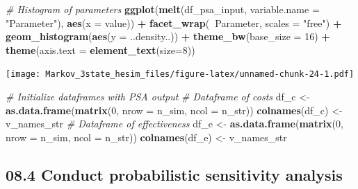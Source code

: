 \documentclass[
]{article}
\newenvironment{Shaded}{\begin{snugshade}}{\end{snugshade}}
\newcommand{\CommentTok}[1]{\textcolor[rgb]{0.56,0.35,0.01}{\textit{#1}}}
\newcommand{\DataTypeTok}[1]{\textcolor[rgb]{0.13,0.29,0.53}{#1}}
\newcommand{\DecValTok}[1]{\textcolor[rgb]{0.00,0.00,0.81}{#1}}
\newcommand{\KeywordTok}[1]{\textcolor[rgb]{0.13,0.29,0.53}{\textbf{#1}}}
\newcommand{\NormalTok}[1]{#1}
\newcommand{\OperatorTok}[1]{\textcolor[rgb]{0.81,0.36,0.00}{\textbf{#1}}}
\newcommand{\StringTok}[1]{\textcolor[rgb]{0.31,0.60,0.02}{#1}}
\begin{document}
\begin{Shaded}
\begin{Highlighting}[]
\CommentTok{# Histogram of parameters}
\KeywordTok{ggplot}\NormalTok{(}\KeywordTok{melt}\NormalTok{(df_psa_input, }\DataTypeTok{variable.name =} \StringTok{"Parameter"}\NormalTok{), }\KeywordTok{aes}\NormalTok{(}\DataTypeTok{x =}\NormalTok{ value)) }\OperatorTok{+}
\StringTok{       }\KeywordTok{facet_wrap}\NormalTok{(}\OperatorTok{~}\NormalTok{Parameter, }\DataTypeTok{scales =} \StringTok{"free"}\NormalTok{) }\OperatorTok{+}
\StringTok{       }\KeywordTok{geom_histogram}\NormalTok{(}\KeywordTok{aes}\NormalTok{(}\DataTypeTok{y =}\NormalTok{ ..density..)) }\OperatorTok{+}
\StringTok{       }\KeywordTok{theme_bw}\NormalTok{(}\DataTypeTok{base_size =} \DecValTok{16}\NormalTok{) }\OperatorTok{+}\StringTok{ }
\StringTok{       }\KeywordTok{theme}\NormalTok{(}\DataTypeTok{axis.text =} \KeywordTok{element_text}\NormalTok{(}\DataTypeTok{size=}\DecValTok{8}\NormalTok{))}
\end{Highlighting}
\end{Shaded}

\texttt{[image: Markov\_3state\_hesim\_files/figure-latex/unnamed-chunk-24-1.pdf]}

\begin{Shaded}
\begin{Highlighting}[]
\CommentTok{# Initialize dataframes with PSA output }
\CommentTok{# Dataframe of costs}
\NormalTok{df_c <-}\StringTok{ }\KeywordTok{as.data.frame}\NormalTok{(}\KeywordTok{matrix}\NormalTok{(}\DecValTok{0}\NormalTok{, }
                      \DataTypeTok{nrow =}\NormalTok{ n_sim,}
                      \DataTypeTok{ncol =}\NormalTok{ n_str))}
\KeywordTok{colnames}\NormalTok{(df_c) <-}\StringTok{ }\NormalTok{v_names_str}
\CommentTok{# Dataframe of effectiveness}
\NormalTok{df_e <-}\StringTok{ }\KeywordTok{as.data.frame}\NormalTok{(}\KeywordTok{matrix}\NormalTok{(}\DecValTok{0}\NormalTok{, }
                      \DataTypeTok{nrow =}\NormalTok{ n_sim,}
                      \DataTypeTok{ncol =}\NormalTok{ n_str))}
\KeywordTok{colnames}\NormalTok{(df_e) <-}\StringTok{ }\NormalTok{v_names_str}
\end{Highlighting}
\end{Shaded}

\hypertarget{conduct-probabilistic-sensitivity-analysis}{%
\subsection{08.4 Conduct probabilistic sensitivity
analysis}\label{conduct-probabilistic-sensitivity-analysis}}
\end{document}

